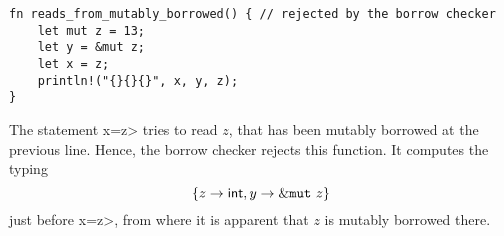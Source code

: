 \begin{verbatim}
fn reads_from_mutably_borrowed() { // rejected by the borrow checker
    let mut z = 13;
    let y = &mut z;
    let x = z;
    println!("{}{}{}", x, y, z);
}
\end{verbatim}

\noindent
The statement \<x=z> tries to read $z$, that has been mutably borrowed
at the previous line. Hence, the borrow checker rejects this function.
It computes the typing
\[
\{z\to\mathsf{int},y\to\&\mathtt{mut}\  z\}
\]
just before \<x=z>, from where it is apparent that $z$ is mutably borrowed there.

%
%

%
%
